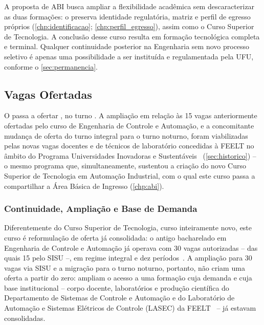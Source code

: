 A proposta de ABI busca ampliar a flexibilidade acadêmica sem descaracterizar as duas formações: o \ppccurso preserva identidade regulatória, matriz e perfil de egresso próprios (\autoref{chp:identificacao}; \autoref{chp:perfil_egresso}), assim como o Curso Superior de Tecnologia. A conclusão desse curso resulta em formação tecnológica completa e terminal. Qualquer continuidade posterior na Engenharia sem novo processo seletivo é apenas uma possibilidade a ser instituída e regulamentada pela UFU, conforme o \autoref{sec:permanencia}.

\subsection{Vagas Ofertadas}

O \ppccurso passa a ofertar \textbf{\ppcvagasofertadas}, no turno \ppcturno. A ampliação em relação às 15 vagas anteriormente ofertadas pelo curso de Engenharia de Controle e Automação, e a concomitante mudança de oferta do turno integral para o turno noturno, foram viabilizadas pelas novas vagas docentes e de técnicos de laboratório concedidas à FEELT no âmbito do Programa Universidades Inovadoras e Sustentáveis~\cite{programa_universidades_inovadoras_sustentaveis} (\autoref{sec:historico}) -- o mesmo programa que, simultaneamente, sustentou a criação do novo Curso Superior de Tecnologia em Automação Industrial, com o qual este curso passa a compartilhar a Área Básica de Ingresso (\autoref{chp:abi}).

\subsubsection{Continuidade, Ampliação e Base de Demanda}

Diferentemente do Curso Superior de Tecnologia, curso inteiramente novo, este curso é reformulação de oferta já consolidada: o antigo bacharelado em Engenharia de Controle e Automação já operava com 30 vagas autorizadas -- das quais 15 pelo SISU --, em regime integral e dez períodos~\cite{ufu_estudo_viabilidade_cst_2026}. A ampliação para 30 vagas via SISU e a migração para o turno noturno, portanto, não criam uma oferta a partir do zero: ampliam o acesso a uma formação cuja demanda e cuja base institucional -- corpo docente, laboratórios e produção científica do Departamento de Sistemas de Controle e Automação e do Laboratório de Automação e Sistemas Elétricos de Controle (LASEC) da FEELT~\cite{feelt_numeros} -- já estavam consolidadas.


